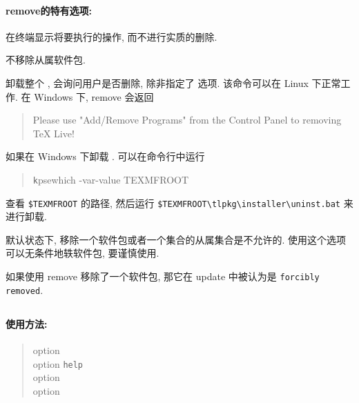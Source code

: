 \paragraph{\textmd{\ac{remove}}的特有选项:}
\begin{description}
    \item {}\par
    在终端显示将要执行的操作, 而不进行实质的删除.
    \item {}\par
    不移除从属软件包.
    \item {}\par
    卸载整个 \tl, 会询问用户是否删除, 除非指定了  选项. 该命令可以在 Linux 下正常工作. 在 Windows 下, \tlmgr{} \ac{remove}  会返回
    \begin{quote}
        \ttfamily Please use "Add/Remove Programs" from the Control Panel to removing TeX Live!
    \end{quote}
    如果在 Windows 下卸载 \tl. 可以在命令行中运行
    \begin{quote}
        \texttt kpsewhich -var-value TEXMFROOT
    \end{quote}
    查看 \verb|$TEXMFROOT| 的路径, 然后运行 \verb|$TEXMFROOT\tlpkg\installer\uninst.bat| 来进行卸载. 
    \item {}\par
    默认状态下, 移除一个软件包或者一个集合的从属集合是不允许的. 使用这个选项可以无条件地轶软件包, 要谨慎使用. 

    如果使用 \tlmgr{} \ac{remove}  移除了一个软件包, 那它在 \tlmgr{} \ac{update}  中被认为是 \texttt{forcibly removed}. 
\end{description}

\clearpage

\subsection{}\label{subsec:option}
\paragraph{使用方法:}

\begin{quote}
    \tlmgr{} \ac{option} \\
    \tlmgr{} \ac{option} \texttt{help} \\
    \tlmgr{} \ac{option}  \\
    \tlmgr{} \ac{option}  
\end{quote}

